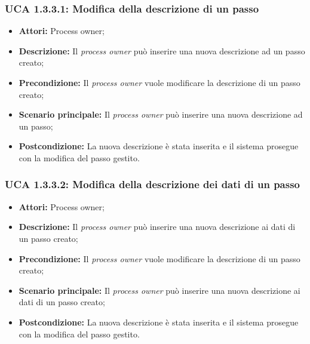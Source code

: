 \hypertarget{A1.3.3.1}{}
\subsubsection{UCA 1.3.3.1: Modifica della descrizione di un passo}
\begin{itemize}
\item \textbf{Attori:} Process owner;
\item \textbf{Descrizione:}
Il \textit{process owner} può inserire una nuova descrizione ad un passo creato;
\item \textbf{Precondizione:}
Il \textit{process owner} vuole modificare la descrizione di un passo creato;
\item \textbf{Scenario principale:}
Il \textit{process owner} può inserire una nuova descrizione ad un passo;
\item \textbf{Postcondizione:}
La nuova descrizione è stata inserita e il sistema prosegue con la modifica del passo gestito.
\end{itemize}

\hypertarget{A1.3.3.2}{}
\subsubsection{UCA 1.3.3.2: Modifica della descrizione dei dati di un passo}
\begin{itemize}
\item \textbf{Attori:} Process owner;
\item \textbf{Descrizione:}
Il \textit{process owner} può inserire una nuova descrizione ai dati di un passo creato;
\item \textbf{Precondizione:}
Il \textit{process owner} vuole modificare la descrizione di un passo creato;
\item \textbf{Scenario principale:}
Il \textit{process owner} può inserire una nuova descrizione ai dati di un passo creato;
\item \textbf{Postcondizione:}
La nuova descrizione è stata inserita e il sistema prosegue con la modifica del passo gestito.
\end{itemize}

\hypertarget{A1.3.3.3}{}
